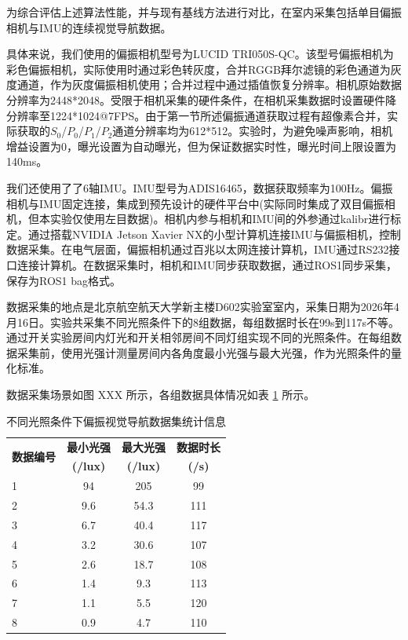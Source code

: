 为综合评估上述算法性能，并与现有基线方法进行对比，在室内采集包括单目偏振相机与IMU的连续视觉导航数据。

具体来说，我们使用的偏振相机型号为LUCID TRI050S-QC。该型号偏振相机为彩色偏振相机，实际使用时通过彩色转灰度，合并RGGB拜尔滤镜的彩色通道为灰度通道，作为灰度偏振相机使用；合并过程中通过插值恢复分辨率。相机原始数据分辨率为2448*2048。受限于相机采集的硬件条件，在相机采集数据时设置硬件降分辨率至1224*1024@7FPS。由于第一节所述偏振通道获取过程有超像素合并，实际获取的$S_0$/$P_0$/$P_1$/$P_2$通道分辨率均为612*512。实验时，为避免噪声影响，相机增益设置为0，曝光设置为自动曝光，但为保证数据实时性，曝光时间上限设置为140ms。

我们还使用了了6轴IMU。IMU型号为ADIS16465，数据获取频率为100Hz。偏振相机与IMU固定连接，集成到预先设计的硬件平台中(实际同时集成了双目偏振相机，但本实验仅使用左目数据)。相机内参与相机和IMU间的外参通过kalibr\cite{rehder2016kalibr}进行标定。通过搭载NVIDIA Jetson Xavier NX的小型计算机连接IMU与偏振相机，控制数据采集。在电气层面，偏振相机通过百兆以太网连接计算机，IMU通过RS232接口连接计算机。在数据采集时，相机和IMU同步获取数据，通过ROS1同步采集，保存为ROS1 bag格式。

数据采集的地点是北京航空航天大学新主楼D602实验室室内，采集日期为2026年4月16日。实验共采集不同光照条件下的8组数据，每组数据时长在99s到117s不等。通过开关实验房间内灯光和开关相邻房间不同灯组实现不同的光照条件。在每组数据采集前，使用光强计测量房间内各角度最小光强与最大光强，作为光照条件的量化标准。

数据采集场景如图 XXX 所示，各组数据具体情况如表 \ref{tab:dataset_stats} 所示。

\begin{table}[htbp]
    \centering
    \caption{不同光照条件下偏振视觉导航数据集统计信息}
    \label{tab:dataset_stats}
    \begin{tabular}{lccc}
        \toprule
        \multirow{2}{*}{\textbf{数据编号}} & \textbf{最小光强} & \textbf{最大光强} & \textbf{数据时长} \\
         & \textbf{(/lux)} & \textbf{(/lux)} & \textbf{(/s)} \\
        \midrule
        1 & 94 & 205 & 99 \\
        2 & 9.6 & 54.3 & 111 \\
        3 & 6.7 & 40.4 & 117 \\
        4 & 3.2 & 30.6 & 107 \\
        5 & 2.6 & 18.7 & 108 \\
        6 & 1.4 & 9.3 & 113 \\
        7 & 1.1 & 5.5 & 120 \\
        8 & 0.9 & 4.7 & 110 \\
        \bottomrule
    \end{tabular}
\end{table}

